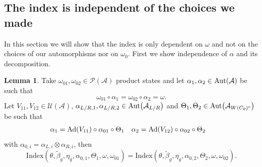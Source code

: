 \documentclass[12pt,a4paper,twoside]{article}
\let\originalleft\left
\let\originalright\right
\renewcommand{\left}{\mathopen{}\mathclose\bgroup\originalleft}
\renewcommand{\right}{\aftergroup\egroup\originalright}
\newcommand{\UU}{\mathcal U}
\newcommand{\PP}{\mathcal P}
\renewcommand{\AA}{\mathcal A}
\newcommand{\Ad}[1]{\textrm{Ad}\left(#1\right)}
\newcommand{\Aut}[1]{\textrm{Aut}\left(#1\right)}
\theoremstyle{definition}
\newtheorem{lemma}[theorem]{Lemma}
\numberwithin{equation}{section}
\begin{document}
\subsection{The index is independent of the choices we made}\label{sec:IndexIsInvariantUnderChoices}
In this section we will show that the index is only dependent on $\omega$ and not on the choices of our automorphisms nor on $\omega_0$. First we show independence of $\alpha$ and its decomposition.
\begin{lemma}
	Take $\omega_{01},\omega_{02}\in\PP(\AA)$ product states and let $\alpha_1,\alpha_2\in\Aut{\AA}$ be such that
	\begin{equation}
		\omega_{01}\circ\alpha_1=\omega_{02}\circ\alpha_2=\omega.
	\end{equation}
	Let $V_{11},V_{12}\in\UU(\AA)$, $\alpha_{L/R,1},\alpha_{L/R,2}\in\Aut{\AA_{L/R}}$ and $\Theta_1,\Theta_2\in \Aut{\AA_{W(C_\theta)^c}}$ be such that
	\begin{align}
		\alpha_1&=\Ad{V_{11}}\circ\alpha_{01}\circ\Theta_1&\alpha_2&=\Ad{V_{12}}\circ\alpha_{02}\circ \Theta_2
	\end{align}
	with $\alpha_{0,i}=\alpha_{L,i}\otimes\alpha_{R,i}$, then
	\begin{equation}
		\textrm{Index}(\theta,\tilde{\beta}_g,\eta_g,\alpha_{0,1},\Theta_1,\omega,\omega_{01})=\textrm{Index}(\theta,\tilde{\beta}_g,\eta_g,\alpha_{0,2},\Theta_2,\omega,\omega_{02}).
	\end{equation}
\end{lemma}
\end{document}
